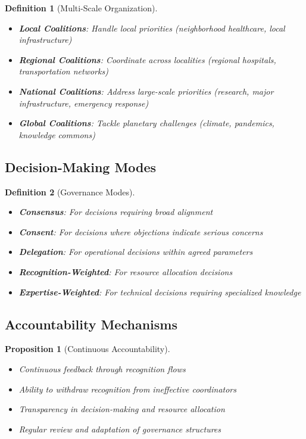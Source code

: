 \documentclass[11pt]{article}
\newtheorem{definition}{Definition}
\newtheorem{proposition}{Proposition}
\begin{document}
\begin{definition}[Multi-Scale Organization]
\begin{itemize}
\item \textbf{Local Coalitions}: Handle local priorities (neighborhood healthcare, local infrastructure)
\item \textbf{Regional Coalitions}: Coordinate across localities (regional hospitals, transportation networks)
\item \textbf{National Coalitions}: Address large-scale priorities (research, major infrastructure, emergency response)
\item \textbf{Global Coalitions}: Tackle planetary challenges (climate, pandemics, knowledge commons)
\end{itemize}
\end{definition}

\subsection{Decision-Making Modes}

\begin{definition}[Governance Modes]
\begin{itemize}
\item \textbf{Consensus}: For decisions requiring broad alignment
\item \textbf{Consent}: For decisions where objections indicate serious concerns
\item \textbf{Delegation}: For operational decisions within agreed parameters
\item \textbf{Recognition-Weighted}: For resource allocation decisions
\item \textbf{Expertise-Weighted}: For technical decisions requiring specialized knowledge
\end{itemize}
\end{definition}

\subsection{Accountability Mechanisms}

\begin{proposition}[Continuous Accountability]
\begin{itemize}
\item Continuous feedback through recognition flows
\item Ability to withdraw recognition from ineffective coordinators
\item Transparency in decision-making and resource allocation
\item Regular review and adaptation of governance structures
\end{itemize}
\end{proposition}
\end{document}
